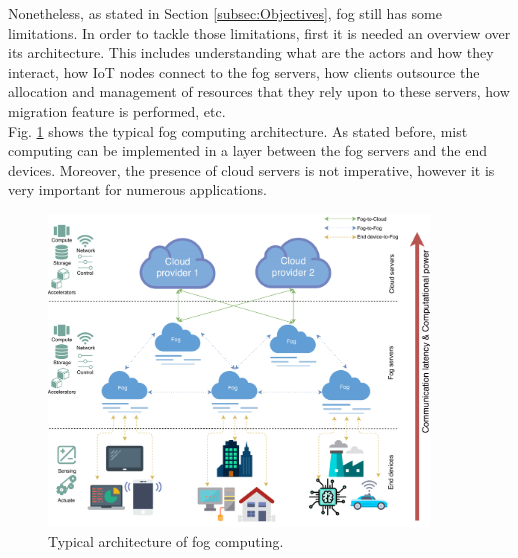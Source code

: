 Nonetheless, as stated in Section \ref{subsec:Objectives}, fog still has some limitations. In order to tackle those limitations, first it is needed an overview over its architecture. This includes understanding what are the actors and how they interact, how IoT nodes connect to the fog servers, how clients outsource the allocation and management of resources that they rely upon to these servers, how migration feature is performed, etc.\\
\noindent\tab Fig. \ref{fog_architecture} shows the typical fog computing architecture. As stated before, mist computing can be implemented in a layer between the fog servers and the end devices. Moreover, the presence of cloud servers is not imperative, however it is very important for numerous applications.

\begin{figure} [t]
	\centering
	\includegraphics[width=0.9\textwidth]{images/fog_architecture/fog_architecture}
	\caption{Typical architecture of fog computing.}
	\label{fog_architecture}
\end{figure}

